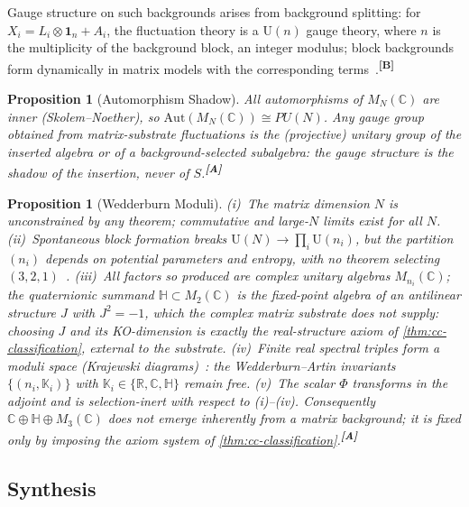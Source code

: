 \documentclass[12pt,a4paper,twoside]{article}
\theoremstyle{plain}
\newtheorem{proposition}[theorem]{Proposition}
\theoremstyle{definition}
\theoremstyle{remark}
\newcommand{\catmark}[1]{\textsuperscript{\textsf{\textbf{[#1]}}}}
\begin{document}
\noindent Gauge structure on such backgrounds arises from background
splitting: for $X_i=L_i\otimes\mathbf{1}_n+A_i$, the fluctuation theory is
a $\mathrm{U}(n)$ gauge theory, where $n$ is the multiplicity of the
background block, an integer modulus; block backgrounds form dynamically
in matrix models with the corresponding
terms~\cite{grosse2005,azuma2004,steinacker2010}.\catmark{B}

\begin{proposition}[Automorphism Shadow]
\label{prop:automorphism-shadow}
All automorphisms of $M_N(\mathbb{C})$ are inner (Skolem--Noether), so
$\mathrm{Aut}(M_N(\mathbb{C}))\cong PU(N)$. Any gauge group obtained from
matrix-substrate fluctuations is the (projective) unitary group of the
inserted algebra or of a background-selected subalgebra: the gauge
structure is the shadow of the insertion, never of $S$.\catmark{A}
\end{proposition}

\begin{proposition}[Wedderburn Moduli]
\label{prop:wedderburn-moduli}
(i)~The matrix dimension $N$ is unconstrained by any theorem; commutative
and large-$N$ limits exist for all $N$. (ii)~Spontaneous block formation
breaks $\mathrm{U}(N)\to\prod_i\mathrm{U}(n_i)$, but the partition $(n_i)$
depends on potential parameters and entropy, with no theorem selecting
$(3,2,1)$~\cite{azuma2004}. (iii)~All factors so produced are complex
unitary algebras $M_{n_i}(\mathbb{C})$; the quaternionic summand
$\mathbb{H}\subset M_2(\mathbb{C})$ is the fixed-point algebra of an
antilinear structure $J$ with $J^2=-1$, which the complex matrix substrate
does not supply: choosing $J$ and its KO-dimension is exactly the
real-structure axiom of \cref{thm:cc-classification}, external to the
substrate. (iv)~Finite real spectral triples form a moduli space
(Krajewski diagrams)~\cite{krajewski1998,paschkesitarz1998}: the
Wedderburn--Artin invariants $\{(n_i,\mathbb{K}_i)\}$ with
$\mathbb{K}_i\in\{\mathbb{R},\mathbb{C},\mathbb{H}\}$ remain free.
(v)~The scalar $\Phi$ transforms in the adjoint and is selection-inert
with respect to (i)--(iv). Consequently
$\mathbb{C}\oplus\mathbb{H}\oplus M_3(\mathbb{C})$ does not emerge
inherently from a matrix background; it is fixed only by imposing the
axiom system of \cref{thm:cc-classification}.\catmark{A}
\end{proposition}

\subsection{Synthesis}
\label{app:synthesis}
\end{document}
